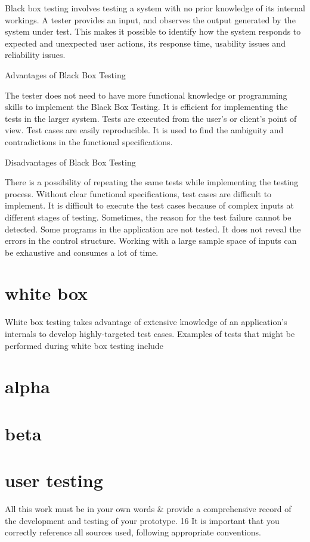 \documentclass{article}
\begin{document}
Black box testing involves testing a system with no prior knowledge of its internal workings. A tester provides an input, and observes the output generated by the system under test. This makes it possible to identify how the system responds to expected and unexpected user actions, its response time, usability issues and reliability issues.

Advantages of Black Box Testing

The tester does not need to have more functional knowledge or programming skills to implement the Black Box Testing.
It is efficient for implementing the tests in the larger system.
Tests are executed from the user’s or client’s point of view.
Test cases are easily reproducible.
It is used to find the ambiguity and contradictions in the functional specifications.

Disadvantages of Black Box Testing

There is a possibility of repeating the same tests while implementing the testing process.
Without clear functional specifications, test cases are difficult to implement.
It is difficult to execute the test cases because of complex inputs at different stages of testing.
Sometimes, the reason for the test failure cannot be detected.
Some programs in the application are not tested.
It does not reveal the errors in the control structure.
Working with a large sample space of inputs can be exhaustive and consumes a lot of time.


\section{white box}
White box testing takes advantage of extensive knowledge of an application’s internals to develop highly-targeted test cases. Examples of tests that might be performed during white box testing include
\section{alpha}
\section{beta}
\section{user testing}
All this work must be in your own words \& provide a comprehensive record of the development
and testing of your prototype.
16
It is important that you correctly reference all sources used, following appropriate conventions.
\end{document}
